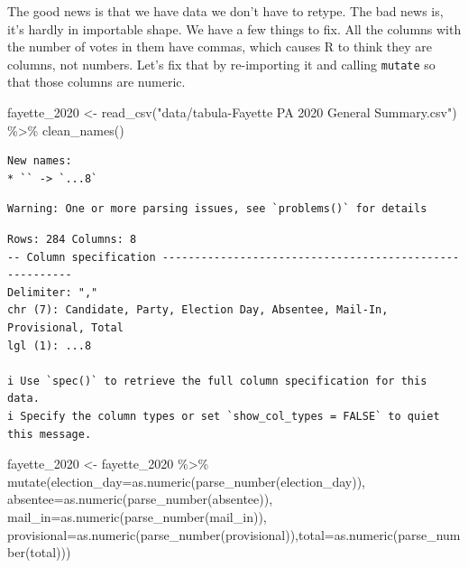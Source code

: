 \documentclass[
  letterpaper,
  DIV=11,
  numbers=noendperiod]{scrreprt}
\newenvironment{Shaded}{\begin{snugshade}}{\end{snugshade}}
\newcommand{\AttributeTok}[1]{\textcolor[rgb]{0.40,0.45,0.13}{#1}}
\newcommand{\FunctionTok}[1]{\textcolor[rgb]{0.28,0.35,0.67}{#1}}
\newcommand{\NormalTok}[1]{\textcolor[rgb]{0.00,0.23,0.31}{#1}}
\newcommand{\OtherTok}[1]{\textcolor[rgb]{0.00,0.23,0.31}{#1}}
\newcommand{\SpecialCharTok}[1]{\textcolor[rgb]{0.37,0.37,0.37}{#1}}
\newcommand{\StringTok}[1]{\textcolor[rgb]{0.13,0.47,0.30}{#1}}
\begin{document}
The good news is that we have data we don't have to retype. The bad news
is, it's hardly in importable shape. We have a few things to fix. All
the columns with the number of votes in them have commas, which causes R
to think they are columns, not numbers. Let's fix that by re-importing
it and calling \texttt{mutate} so that those columns are numeric.

\begin{Shaded}
\begin{Highlighting}[]
\NormalTok{fayette\_2020 }\OtherTok{\textless{}{-}} \FunctionTok{read\_csv}\NormalTok{(}\StringTok{"data/tabula{-}Fayette PA 2020 General Summary.csv"}\NormalTok{) }\SpecialCharTok{\%\textgreater{}\%} \FunctionTok{clean\_names}\NormalTok{()}
\end{Highlighting}
\end{Shaded}

\begin{verbatim}
New names:
* `` -> `...8`
\end{verbatim}

\begin{verbatim}
Warning: One or more parsing issues, see `problems()` for details
\end{verbatim}

\begin{verbatim}
Rows: 284 Columns: 8
-- Column specification --------------------------------------------------------
Delimiter: ","
chr (7): Candidate, Party, Election Day, Absentee, Mail-In, Provisional, Total
lgl (1): ...8

i Use `spec()` to retrieve the full column specification for this data.
i Specify the column types or set `show_col_types = FALSE` to quiet this message.
\end{verbatim}

\begin{Shaded}
\begin{Highlighting}[]
\NormalTok{fayette\_2020 }\OtherTok{\textless{}{-}}\NormalTok{ fayette\_2020 }\SpecialCharTok{\%\textgreater{}\%} \FunctionTok{mutate}\NormalTok{(}\AttributeTok{election\_day=}\FunctionTok{as.numeric}\NormalTok{(}\FunctionTok{parse\_number}\NormalTok{(election\_day)), }\AttributeTok{absentee=}\FunctionTok{as.numeric}\NormalTok{(}\FunctionTok{parse\_number}\NormalTok{(absentee)), }\AttributeTok{mail\_in=}\FunctionTok{as.numeric}\NormalTok{(}\FunctionTok{parse\_number}\NormalTok{(mail\_in)), }\AttributeTok{provisional=}\FunctionTok{as.numeric}\NormalTok{(}\FunctionTok{parse\_number}\NormalTok{(provisional)),}\AttributeTok{total=}\FunctionTok{as.numeric}\NormalTok{(}\FunctionTok{parse\_number}\NormalTok{(total)))}
\end{Highlighting}
\end{Shaded}
\end{document}
